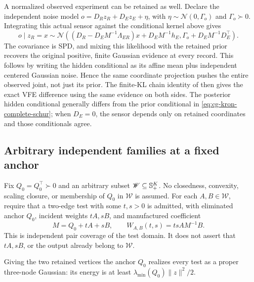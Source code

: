 A normalized observed experiment can be retained as well. Declare the
independent noise model
\(o=D_Rz_R+D_Ez_E+\eta\), with
\(\eta\sim\mathcal N(0,\Gamma_o)\) and \(\Gamma_o\succ0\).
Integrating this actual sensor against the conditional kernel above gives
\begin{equation}
o\mid z_R=x\sim
\mathcal N\left(
(D_R-D_EM^{-1}\Lambda_{ER})x+D_EM^{-1}h_E,
\Gamma_o+D_EM^{-1}D_E^\top
\right).
\label{eq:cg-kron-induced-sensor}
\end{equation}
The covariance is SPD, and mixing this likelihood with the retained prior
recovers the original positive, finite Gaussian evidence at every record.
This follows by writing the hidden conditional as its affine mean plus
independent centered Gaussian noise. Hence the same coordinate projection
pushes the entire observed joint, not just its prior. The finite-KL chain
identity of  then gives the exact VFE difference
using the same evidence on both sides. The posterior hidden conditional
generally differs from the prior conditional in
\eqref{eq:cg-kron-complete-schur}; when \(D_E=0\), the sensor depends only
on retained coordinates and those conditionals agree.

\subsection{Arbitrary independent families at a fixed anchor}
\label{sec:cg-independent-kron-families}

Fix \(Q_0=Q_0^\top\succ0\) and an arbitrary subset
\(\mathscr W\subseteq\mathbb S_{+}^K\). No closedness, convexity, scaling closure,
or membership of \(Q_0\) in \(\mathscr W\) is assumed. For each
\(A,B\in\mathscr W\), require that a two-edge test with some \(t,s>0\)
is admitted, with eliminated anchor \(Q_0\), incident weights \(tA,sB\),
and manufactured coefficient
\begin{equation}
M=Q_0+tA+sB,\qquad
W_{A,B}(t,s)=tsAM^{-1}B.
\label{eq:cg-independent-pair-test}
\end{equation}
This is independent pair coverage of the test domain. It does not assert
that \(tA,sB\), or the output already belong to \(\mathscr W\).

Giving the two retained vertices the anchor \(Q_0\) realizes every test
as a proper three-node Gaussian: its energy is at least
\(\lambda_{\min}(Q_0)\|z\|^2/2\).

